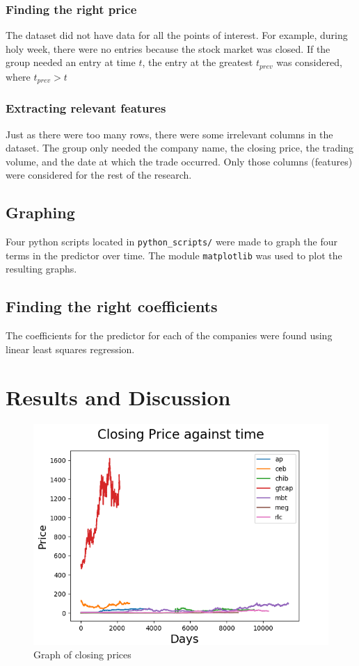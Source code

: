 \documentclass[8pt]{article}
\begin{document}
		\subsubsection{Finding the right price}
		The dataset did not have data for all the points of interest.
		For example, during holy week, there were no entries because the stock market was closed.
		If the group needed an entry at time $t$, the entry at the greatest 
		$t_{prev}$ was considered, where $t_{prev} > t$
		\subsubsection{Extracting relevant features}
		Just as there were too many rows, there were some irrelevant columns in the dataset.
		The group only needed the company name, the closing price, the trading volume, and the date at which the trade occurred.
		Only those columns (features) were considered for the rest of the research.

	\subsection{Graphing}
	Four python scripts located in \texttt{python\_scripts/} were made to graph the four terms in the predictor over time.
	The module \texttt{matplotlib} was used to plot the resulting graphs.

	\subsection{Finding the right coefficients}
	The coefficients for the predictor for each of the companies were found using linear least squares regression.

	\section{Results and Discussion}

	\begin{figure}[h]
		\centering
		\includegraphics{all_closing_price.png}
		\caption{Graph of closing prices}
		\label{fig:close_price_graph}
	\end{figure}
\end{document}
